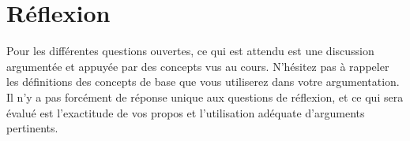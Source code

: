 \chapter{Réflexion}
Pour les différentes questions ouvertes, ce qui est attendu est une discussion argumentée et appuyée
par des concepts vus au cours. N’hésitez pas à rappeler les définitions des concepts de base que vous
utiliserez dans votre argumentation. Il n’y a pas forcément de réponse unique aux questions de réflexion,
et ce qui sera évalué est l’exactitude de vos propos et l’utilisation adéquate d’arguments pertinents.
\paragraph{}
\begin{enumerate}\setlength\itemsep{1em}


\end{enumerate}

